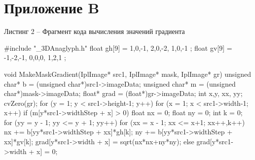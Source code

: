 \documentclass[a4paper,12pt]{article}
\begin{document}
\section*{ \centering Приложение B} 

\begin{center}
	Листинг 2 -- Фрагмент кода вычисления значений градиента
\end{center}

\begin{MyCode}
	
#include "_3DAnaglyph.h"
float gh[9] = {
	1,0,-1,
	2,0,-2,
	1,0,-1
};
float gv[9] = {
	-1,-2,-1,
	0,0,0,
	1,2,1
};

void MakeMaskGradient(IplImage* src1, IplImage* mask, IplImage* gr)
{
	unsigned char* b = (unsigned char*)src1->imageData;
	unsigned char* m = (unsigned char*)mask->imageData;
	float* grad = (float*)gr->imageData;
	int x,y, xx, yy;
	cvZero(gr);
	for (y = 1; y < src1->height-1; y++)
	for (x = 1; x < src1->width-1; x++)
	{
		if (m[y*src1->widthStep + x] > 0)
		{
			float nx = 0; 
			float ny = 0;
			int k  = 0;
			for (yy = y - 1; yy <= y + 1; yy++)
			{
				for (xx = x - 1; xx <= x+1; xx++,k++)
				{
					nx += b[yy*src1->widthStep + xx]*gh[k];				
					ny += b[yy*src1->widthStep + xx]*gv[k];				
				}
			}
			grad[y*src1->width + x] = sqrt(nx*nx+ny*ny);
		}
		else
		grad[y*src1->width + x] = 0;
	}
}

\end{MyCode}
\end{document}
